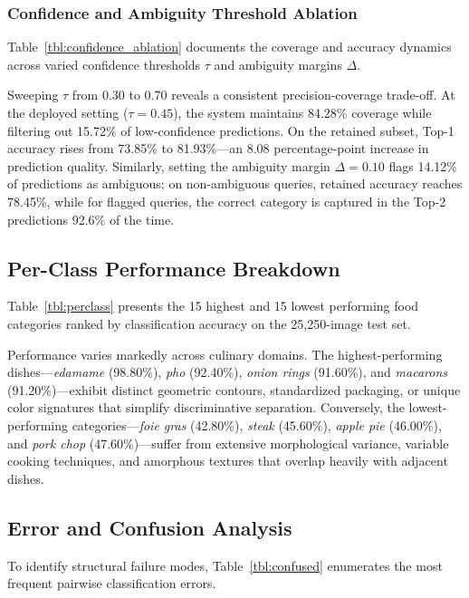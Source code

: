\documentclass[conference]{IEEEtran}
\begin{document}
\subsubsection{Confidence and Ambiguity Threshold Ablation}
Table~\ref{tbl:confidence_ablation} documents the coverage and accuracy dynamics across varied confidence thresholds $\tau$ and ambiguity margins $\Delta$.

{\setlength{\tabcolsep}{3pt}}

Sweeping $\tau$ from 0.30 to 0.70 reveals a consistent precision-coverage trade-off. At the deployed setting ($\tau = 0.45$), the system maintains 84.28\% coverage while filtering out 15.72\% of low-confidence predictions. On the retained subset, Top-1 accuracy rises from 73.85\% to 81.93\%---an 8.08 percentage-point increase in prediction quality. Similarly, setting the ambiguity margin $\Delta = 0.10$ flags 14.12\% of predictions as ambiguous; on non-ambiguous queries, retained accuracy reaches 78.45\%, while for flagged queries, the correct category is captured in the Top-2 predictions 92.6\% of the time.

\subsection{Per-Class Performance Breakdown}
Table~\ref{tbl:perclass} presents the 15 highest and 15 lowest performing food categories ranked by classification accuracy on the 25,250-image test set.



Performance varies markedly across culinary domains. The highest-performing dishes---\textit{edamame} (98.80\%), \textit{pho} (92.40\%), \textit{onion rings} (91.60\%), and \textit{macarons} (91.20\%)---exhibit distinct geometric contours, standardized packaging, or unique color signatures that simplify discriminative separation. Conversely, the lowest-performing categories---\textit{foie gras} (42.80\%), \textit{steak} (45.60\%), \textit{apple pie} (46.00\%), and \textit{pork chop} (47.60\%)---suffer from extensive morphological variance, variable cooking techniques, and amorphous textures that overlap heavily with adjacent dishes.

\subsection{Error and Confusion Analysis}
To identify structural failure modes, Table~\ref{tbl:confused} enumerates the most frequent pairwise classification errors.
\end{document}
